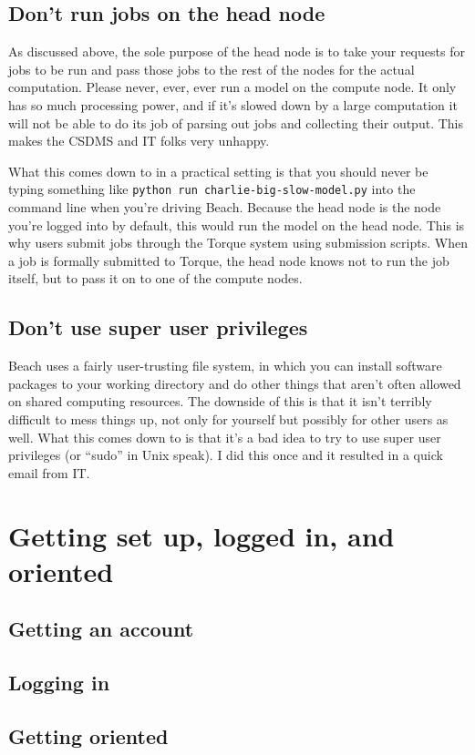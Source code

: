 \documentclass[12pt, oneside]{article}   	%
\begin{document}
\subsection{Don't run jobs on the head node}
As discussed above, the sole purpose of the head node is to take your requests for jobs to be run and pass those jobs to the rest of the nodes for the actual computation. Please never, \Large{ever,} \Huge{ever} \normalsize run a model on the compute node. It only has so much processing power, and if it's slowed down by a large computation it will not be able to do its job of parsing out jobs and collecting their output. This makes the CSDMS and IT folks very unhappy.\par
What this comes down to in a practical setting is that you should never be typing something like \texttt{python run charlie-big-slow-model.py} into the command line when you're driving Beach. Because the head node is the node you're logged into by default, this would run the model on the head node. This is why users submit jobs through the Torque system using submission scripts. When a job is formally submitted to Torque, the head node knows not to run the job itself, but to pass it on to one of the compute nodes.
\subsection{Don't use super user privileges}
Beach uses a fairly user-trusting file system, in which you can install software packages to your working directory and do other things that aren't often allowed on shared computing resources. The downside of this is that it isn't terribly difficult to mess things up, not only for yourself but possibly for other users as well. What this comes down to is that it's a bad idea to try to use super user privileges (or ``sudo'' in Unix speak). I did this once and it resulted in a quick email from IT. 

\section{Getting set up, logged in, and oriented}
\subsection{Getting an account}
\subsection{Logging in}
\subsection{Getting oriented}
\end{document}
